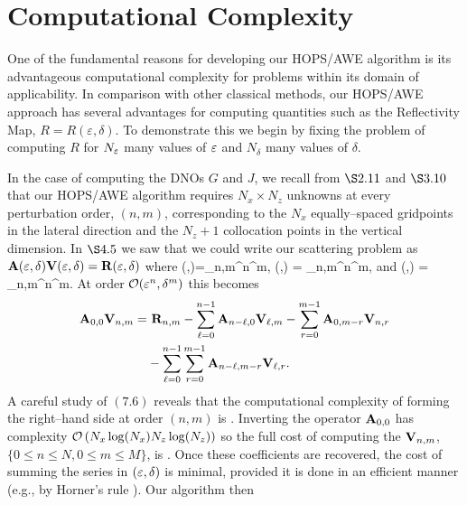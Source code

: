 \section{Computational Complexity}
\label{Sec: Computational Complexity}

One of the fundamental reasons for developing our HOPS/AWE algorithm is its advantageous computational complexity for problems within its domain of applicability.
In comparison with other classical methods, our HOPS/AWE approach has several advantages for computing quantities such as the Reflectivity Map, $R=R(\varepsilon,\delta)$. To demonstrate this we begin
by fixing the problem of computing $R$ for $N_{\varepsilon}$ many values of 
$\varepsilon$ and $N_{\delta}$ many values of $\delta$.

In the case of computing the DNOs $G$ and $J$, we recall from $\S 2.11$ and $\S 3.10$ that our HOPS/AWE algorithm requires
$N_x \times N_z$ unknowns at every perturbation order, $(n,m)$, corresponding to
the $N_x$ equally--spaced gridpoints in the lateral direction and the $N_z + 1$ collocation points in the vertical dimension. In $\S 4.5$ we saw that we could write our scattering problem as $\mathbf{A}(\varepsilon,\delta) \mathbf{V}(\varepsilon,\delta) = \mathbf{R}(\varepsilon,\delta)$ where
\bes
    \bA(\Eps,\delta)=\sumn \summ \bA_{n,m}\Eps^n\delta^m, \quad \bR(\Eps,\delta) = \sumn \summ \bR_{n,m}\Eps^{n}\delta^m,
\ees
and
\bes
\label{Eqn:Soln:Two_Param_Append}
\bV(\Eps,\delta) = \sumn \summ \bV_{n,m}\Eps^{n}\delta^m.
\ees
At order $\mathcal{O}(\varepsilon^n,\delta^m)$ this becomes
\begin{align}
\begin{split}
\mathbf{A}_{0,0}\mathbf{V}_{n,m}=&~\mathbf{R}_{n,m}-\sum_{\ell=0}^{n-1}\mathbf{A}_{n-\ell,0}\mathbf{V}_{\ell,m}-\sum_{r=0}^{m-1}\mathbf{A}_{0,m-r}\mathbf{V}_{n,r}\\&
-\sum_{\ell=0}^{n-1}\sum_{r=0}^{m-1}\mathbf{A}_{n-\ell,m-r}\mathbf{V}_{\ell,r}.
\end{split}
\end{align}
A careful study of $(7.6)$
reveals that the computational complexity of forming the
right--hand side at order $(n,m)$ is
\bes
{}.
\ees
Inverting the operator $\mathbf{A}_{0,0}$ has complexity $\mathcal{O} \left( N_x \log(N_x) N_z \log(N_z) \right)$
so the full cost of computing the $\mathbf{V}_{n,m}$, 
$\{ 0 \leq n \leq N, 0 \leq m \leq M \}$, is
\bes
{}.
\ees
Once these coefficients are recovered, the cost of summing the series in 
$(\varepsilon,\delta)$ is minimal, provided it is done in an efficient manner 
(e.g., by Horner's rule \cite{BurdenFaires,AtkinsonHan01}). Our algorithm then 
